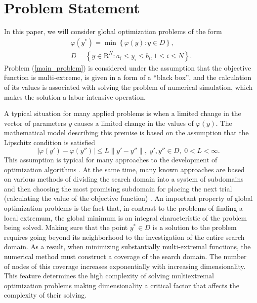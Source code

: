 \documentclass[entropy,article,submit,moreauthors,pdftex]{Definitions/mdpi}
\begin{document}
\section{Problem Statement}

In this paper, we will consider global optimization problems of the form
\begin{eqnarray}\label{main_problem}
& \varphi(y^\ast)=\min{\left\{\varphi(y):y\in D\right\}},\\
& D=\left\{y\in \text{R}^N: a_i\leq y_i \leq b_i, 1\leq i \leq N\right\}. \nonumber
\end{eqnarray}
Problem (\ref{main_problem}) is considered under the assumption that the objective function is multi-extreme, is given in a form of a ``black box'', and the calculation of its values is associated with solving the problem of numerical simulation, which makes the solution a labor-intensive operation.

A typical situation for many applied problems is when a limited change in the vector of parameters $y$ causes a limited change in the values of $\varphi(y)$. The mathematical model describing this premise is based on the assumption that the Lipschitz condition is satisfied
\[
\left|\varphi(y')-\varphi(y'')\right|\leq L\left\|y'-y''\right\|,\; y',y'' \in D,\; 0<L<\infty.
\]
This assumption is typical for many approaches to the development of optimization algorithms \cite{Jones1993,Pinter1996,Zilinskas2008,Evtushenko2009}.
At the same time, many known approaches are based on various methods of dividing the search domain into a system of subdomains and then choosing the most promising subdomain for placing the next trial (calculating the value of the objective function)  \cite{Jones2009,Zilinskas2010,Evtushenko2013,Kvasov2013,Paulavicius2016}. 
An important property of global optimization problems is the fact that, in contrast to the problems of finding a local extremum, the global minimum is an integral characteristic of the problem being solved. Making sure that the point  $y^*\in D$ is a solution to the problem requires going beyond its neighborhood to the investigation of the entire search domain. As a result, when minimizing substantially multi-extremal functions, the numerical method must construct a coverage of the search domain. The number of nodes of this coverage increases exponentially with increasing dimensionality. 
This feature determines the high complexity of solving multiextremal optimization problems making dimensionality a critical factor that affects the complexity of their solving.
\end{document}
